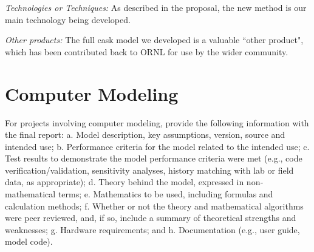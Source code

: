 \documentclass[12pt]{article}
\begin{document}
\textit{Technologies or Techniques:} As described in the proposal, the new method is our main technology being developed. 

\textit{Other products:} The full cask model we developed is a valuable ``other product", which has been contributed back to ORNL for use by the wider community.


\section{Computer Modeling}
\label{sect::modeling}
For projects involving computer modeling, provide the following information with the final
report:
a. Model description, key assumptions, version, source and intended use;
b. Performance criteria for the model related to the intended use;
c. Test results to demonstrate the model performance criteria were met (e.g., code
verification/validation, sensitivity analyses, history matching with lab or field data, as
appropriate);
d. Theory behind the model, expressed in non‐mathematical terms;
e. Mathematics to be used, including formulas and calculation methods;
f. Whether or not the theory and mathematical algorithms were peer reviewed, and, if so,
include a summary of theoretical strengths and weaknesses;
g. Hardware requirements; and
h. Documentation (e.g., user guide, model code).






\appendix

\makeatletter
\def\@seccntformat#1{APPENDIX \csname the#1\endcsname.~}
\makeatother

%
%
%
\end{document}
